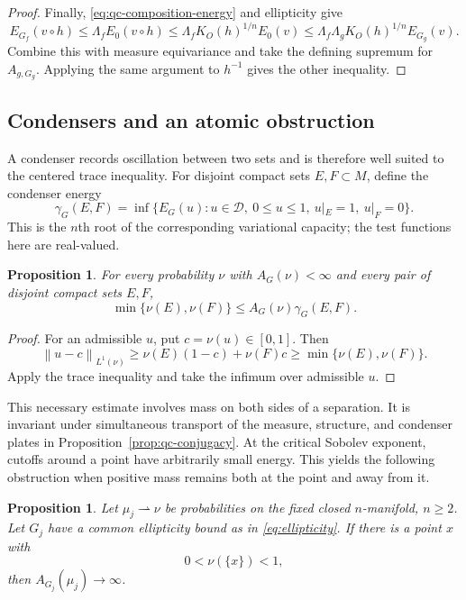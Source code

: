 \documentclass[11pt,reqno]{amsart}
\theoremstyle{plain}
\newtheorem{proposition}[theorem]{Proposition}
\theoremstyle{definition}
\theoremstyle{remark}
\newcommand{\Dcal}{\mathcal D}
\newcommand{\norm}[1]{\left\lVert #1\right\rVert}
\numberwithin{equation}{section}
\begin{document}
\begin{proof}
Finally, \eqref{eq:qc-composition-energy} and ellipticity give
\[
 E_{G_f}(v\circ h)
 \le\Lambda_f E_0(v\circ h)
 \le\Lambda_f K_O(h)^{1/n}E_0(v)
 \le\Lambda_f\Lambda_g K_O(h)^{1/n}E_{G_g}(v).
\]
Combine this with measure equivariance and take the defining supremum for $A_{g,G_g}$. Applying the same argument to $h^{-1}$ gives the other inequality.
\end{proof}

\subsection{Condensers and an atomic obstruction}

A condenser records oscillation between two sets and is therefore well suited to the centered trace inequality. For disjoint compact sets $E,F\subset M$, define the condenser energy
\[
 \gamma_G(E,F)=\inf\{E_G(u):u\in\Dcal,\ 0\le u\le1,
                    \ u|_E=1,\ u|_F=0\}.
\]
This is the $n$th root of the corresponding variational capacity; the test functions here are real-valued.

\begin{proposition}\label{prop:condenser}
For every probability $\nu$ with $A_G(\nu)<\infty$ and every pair of disjoint compact sets $E,F$,
\begin{equation}\label{eq:condenser-necessary}
 \min\{\nu(E),\nu(F)\}\le A_G(\nu)\gamma_G(E,F).
\end{equation}
\end{proposition}

\begin{proof}
For an admissible $u$, put $c=\nu(u)\in[0,1]$. Then
\[
 \norm{u-c}_{L^1(\nu)}
 \ge\nu(E)(1-c)+\nu(F)c
 \ge\min\{\nu(E),\nu(F)\}.
\]
Apply the trace inequality and take the infimum over admissible $u$.
\end{proof}

This necessary estimate involves mass on both sides of a separation. It is invariant under simultaneous transport of the measure, structure, and condenser plates in Proposition~\ref{prop:qc-conjugacy}. At the critical Sobolev exponent, cutoffs around a point have arbitrarily small energy. This yields the following obstruction when positive mass remains both at the point and away from it.

\begin{proposition}\label{prop:atomic-obstruction}
Let $\mu_j\rightharpoonup\nu$ be probabilities on the fixed closed $n$-manifold, $n\ge2$. Let $G_j$ have a common ellipticity bound as in \eqref{eq:ellipticity}. If there is a point $x$ with
\[
 0<\nu(\{x\})<1,
\]
then $A_{G_j}(\mu_j)\to\infty$.
\end{proposition}
\end{document}
